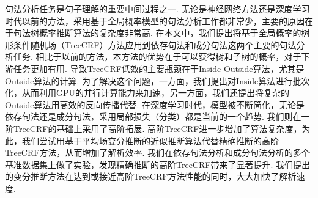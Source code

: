 
\begin{cabstract}
  句法分析任务是句子理解的重要中间过程之一.
  无论是神经网络方法还是深度学习时代以前的方法，采用基于全局概率模型的句法分析工作都非常少，主要的原因在于句法树概率推断算法的复杂度非常高.
  在本文中，我们提出将基于全局概率的树形条件随机场（TreeCRF）方法应用到依存句法和成分句法这两个主要的句法分析任务.
  相比于以前的方法，本方法的优势在于可以获得树和子树的概率，对于下游任务更加有用.
  导致TreeCRF低效的主要瓶颈在于Inside-Outside算法，尤其是Outside算法的计算.
  为了解决这个问题，一方面，我们提出对Inside算法进行批次化，从而利用GPU的并行计算能力来加速，另一方面，我们还提出将复杂的Outside算法用高效的反向传播代替.
  在深度学习时代，模型被不断简化，无论是依存句法还是成分句法，采用局部损失（分类）都是当前的一个趋势.
  我们则在一阶TreeCRF的基础上采用了高阶拓展.
  高阶TreeCRF进一步增加了算法复杂度，为此，我们尝试用基于平均场变分推断的近似推断算法代替精确推断的高阶TreeCRF方法，从而增加了解析效率.
  我们在依存句法分析和成分句法分析的多个基准数据集上做了实验，发现精确推断的高阶TreeCRF带来了显著提升.
  我们提出的变分推断方法在达到或接近高阶TreeCRF方法性能的同时，大大加快了解析速度.


\end{cabstract}
